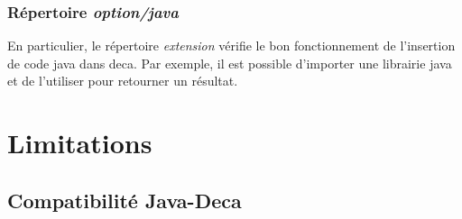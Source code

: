 \documentclass[12pt, a4paper, one side]{article}
\begin{document}
    \subsubsection{Répertoire \textit{option/java}}
    En particulier, le répertoire \textit{extension} vérifie le bon fonctionnement de l'insertion de code java dans deca. Par exemple, il est possible d'importer une librairie java et de l'utiliser pour retourner un résultat.


    \section{Limitations}
    \subsection{Compatibilité Java-Deca}

    \newpage
    \printbibliography
\end{document}
